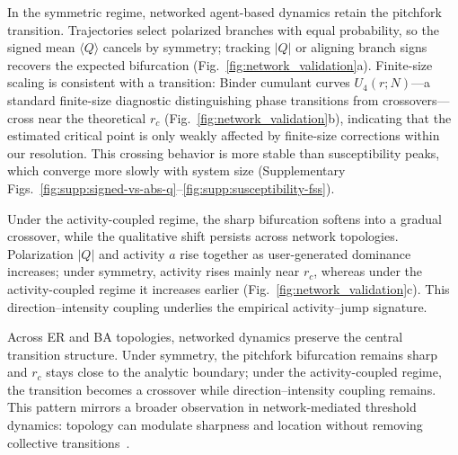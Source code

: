 \documentclass[12pt]{article}
\begin{document}
In the symmetric regime, networked agent-based dynamics retain the pitchfork transition. Trajectories select polarized branches with equal probability, so the signed mean $\langle Q\rangle$ cancels by symmetry; tracking $|Q|$ or aligning branch signs recovers the expected bifurcation (Fig.~\ref{fig:network_validation}a). Finite-size scaling is consistent with a transition: Binder cumulant curves $U_4(r;N)$---a standard finite-size diagnostic distinguishing phase transitions from crossovers---cross near the theoretical $r_c$ (Fig.~\ref{fig:network_validation}b), indicating that the estimated critical point is only weakly affected by finite-size corrections within our resolution. This crossing behavior is more stable than susceptibility peaks, which converge more slowly with system size (Supplementary Figs.~\ref{fig:supp:signed-vs-abs-q}--\ref{fig:supp:susceptibility-fss}).

Under the activity-coupled regime, the sharp bifurcation softens into a gradual crossover, while the qualitative shift persists across network topologies. Polarization $|Q|$ and activity $a$ rise together as user-generated dominance increases; under symmetry, activity rises mainly near $r_c$, whereas under the activity-coupled regime it increases earlier (Fig.~\ref{fig:network_validation}c). This direction--intensity coupling underlies the empirical activity--jump signature.

Across ER and BA topologies, networked dynamics preserve the central transition structure. Under symmetry, the pitchfork bifurcation remains sharp and $r_c$ stays close to the analytic boundary; under the activity-coupled regime, the transition becomes a crossover while direction--intensity coupling remains. This pattern mirrors a broader observation in network-mediated threshold dynamics: topology can modulate sharpness and location without removing collective transitions~\cite{Watts2002,Centola2010,Centola2018Tipping,Iacopini2019}.
\end{document}
